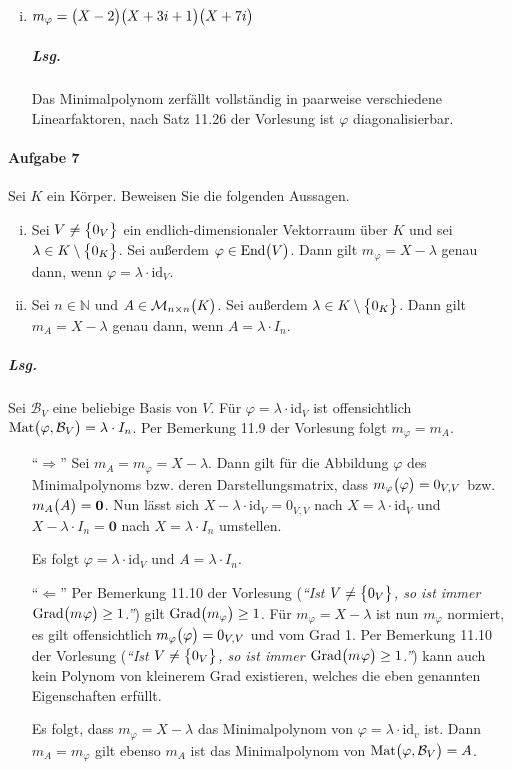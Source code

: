 \documentclass{scrreprt}
\newcommand{\End}{\text{End}}
\newcommand{\Grad}{\text{Grad}}
\newcommand{\Mat}{\text{Mat}}
\begin{document}
\begin{enumerate}[(a)]
\begin{enumerate}[(i)]
\newpage
  \item $m_{\varphi} = \qty\big(X - 2)\qty\big(X + 3i + 1)\qty\big(X + 7i)$
    \subparagraph{Lsg.} Das Minimalpolynom zerfällt vollständig in paarweise
    verschiedene Linearfaktoren, nach Satz 11.26 der Vorlesung ist
    $\varphi$ diagonalisierbar.
  \end{enumerate}
\end{enumerate}

\paragraph{Aufgabe 7} Sei $K$ ein Körper.
Beweisen Sie die folgenden Aussagen.
\begin{enumerate}[(i)]
\item Sei $V \ne \qty\big{0_V}$ ein endlich-dimensionaler Vektorraum über $K$
  und sei $\lambda \in K \setminus \qty\big{0_K}$.
  Sei außerdem $\varphi \in \End\qty\big(V)$.
  Dann gilt $m_{\varphi} = X - \lambda$ genau dann, wenn
  $\varphi = \lambda \cdot \text{id}_V$.
\item Sei $n \in \mathbb{N}$ und $A \in \mathcal{M}_{n \times n}\qty\big(K)$.
  Sei außerdem  $\lambda \in K \setminus \qty\big{0_K}$.
  Dann gilt $m_A = X - \lambda$ genau dann, wenn $A = \lambda \cdot I_n$.
\end{enumerate}

\subparagraph{Lsg.} Sei $\mathcal{B}_V$ eine beliebige Basis von $V$.
Für $\varphi = \lambda \cdot \text{id}_V$ ist offensichtlich
$\Mat\qty\big(\varphi, \mathcal{B}_V) = \lambda \cdot I_n$.
Per Bemerkung 11.9 der Vorlesung folgt $m_{\varphi} = m_A$.
\begin{itemize}
\item[``$\Rightarrow$'']
  Sei $m_A = m_{\varphi} = X - \lambda$.
  Dann gilt für die Abbildung $\varphi$ des Minimalpolynoms bzw. deren
  Darstellungsmatrix, dass $m_{\varphi}\qty\big(\varphi) = 0_{V,V}$ bzw.
  $m_A\qty\big(A) = \textbf{0}$.
  Nun lässt sich $X - \lambda \cdot \text{id}_V = 0_{V,V}$ nach
  $X = \lambda \cdot \text{id}_V$ und $X - \lambda \cdot I_n = \textbf{0}$ nach
  $X = \lambda \cdot I_n$ umstellen.

  Es folgt $\varphi = \lambda \cdot \text{id}_V$ und $A = \lambda \cdot I_n$.
\item[``$\Leftarrow$'']
  Per Bemerkung 11.10 der Vorlesung (\emph{``Ist $V \ne \qty\big{0_V}$, so ist
    immer $\Grad\qty\big(m_{}\varphi) \geq 1$.''}) gilt
  $\Grad\qty\big(m_{\varphi}) \geq 1$.
  Für $m_{\varphi} = X - \lambda$ ist nun $m_{\varphi}$ normiert, es gilt
  offensichtlich $m_{\varphi}\qty\big(\varphi) = 0_{V, V}$ und vom Grad 1.
  Per Bemerkung 11.10 der Vorlesung (\emph{``Ist $V \ne \qty\big{0_V}$, so ist
    immer $\Grad\qty\big(m_{}\varphi) \geq 1$.''}) kann auch kein Polynom
  von kleinerem Grad existieren, welches die eben genannten Eigenschaften
  erfüllt.

  Es folgt, dass $m_{\varphi} = X - \lambda$ das Minimalpolynom von
  $\varphi = \lambda \cdot \text{id}_v$ ist.
  Dann $m_A = m_{\varphi}$ gilt ebenso $m_A$ ist das Minimalpolynom von
  $\Mat\qty\big(\varphi, \mathcal{B}_V) = A$.
\end{itemize}
\end{document}
